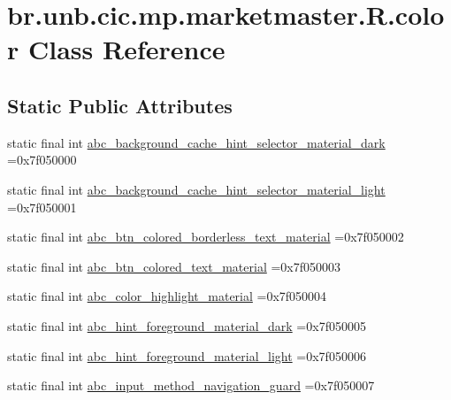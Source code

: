\hypertarget{classbr_1_1unb_1_1cic_1_1mp_1_1marketmaster_1_1R_1_1color}{}\section{br.\+unb.\+cic.\+mp.\+marketmaster.\+R.\+color Class Reference}
\label{classbr_1_1unb_1_1cic_1_1mp_1_1marketmaster_1_1R_1_1color}
\subsection*{Static Public Attributes}
\begin{DoxyCompactItemize}
\item 
static final int \mbox{\hyperlink{classbr_1_1unb_1_1cic_1_1mp_1_1marketmaster_1_1R_1_1color_ac006ece61b62832e727b0d618b803900}{abc\+\_\+background\+\_\+cache\+\_\+hint\+\_\+selector\+\_\+material\+\_\+dark}} =0x7f050000
\item 
static final int \mbox{\hyperlink{classbr_1_1unb_1_1cic_1_1mp_1_1marketmaster_1_1R_1_1color_a29468679959d5436f735ceb7ddbbc305}{abc\+\_\+background\+\_\+cache\+\_\+hint\+\_\+selector\+\_\+material\+\_\+light}} =0x7f050001
\item 
static final int \mbox{\hyperlink{classbr_1_1unb_1_1cic_1_1mp_1_1marketmaster_1_1R_1_1color_a89a85d0af37b3309e97bd42940c5cd2a}{abc\+\_\+btn\+\_\+colored\+\_\+borderless\+\_\+text\+\_\+material}} =0x7f050002
\item 
static final int \mbox{\hyperlink{classbr_1_1unb_1_1cic_1_1mp_1_1marketmaster_1_1R_1_1color_a887132c8c6f2e6ded6c965d4e5b17c27}{abc\+\_\+btn\+\_\+colored\+\_\+text\+\_\+material}} =0x7f050003
\item 
static final int \mbox{\hyperlink{classbr_1_1unb_1_1cic_1_1mp_1_1marketmaster_1_1R_1_1color_a1a25379a9d77886c4fb2411b29d0a094}{abc\+\_\+color\+\_\+highlight\+\_\+material}} =0x7f050004
\item 
static final int \mbox{\hyperlink{classbr_1_1unb_1_1cic_1_1mp_1_1marketmaster_1_1R_1_1color_a46a692af2a986a5f9ab3e5340119dde3}{abc\+\_\+hint\+\_\+foreground\+\_\+material\+\_\+dark}} =0x7f050005
\item 
static final int \mbox{\hyperlink{classbr_1_1unb_1_1cic_1_1mp_1_1marketmaster_1_1R_1_1color_aa98db48f50d89ddacd4c885b71d39ae0}{abc\+\_\+hint\+\_\+foreground\+\_\+material\+\_\+light}} =0x7f050006
\item 
static final int \mbox{\hyperlink{classbr_1_1unb_1_1cic_1_1mp_1_1marketmaster_1_1R_1_1color_adc99aa8fea626d9bf2fece4b6cd75282}{abc\+\_\+input\+\_\+method\+\_\+navigation\+\_\+guard}} =0x7f050007

\end{DoxyCompactItemize}
